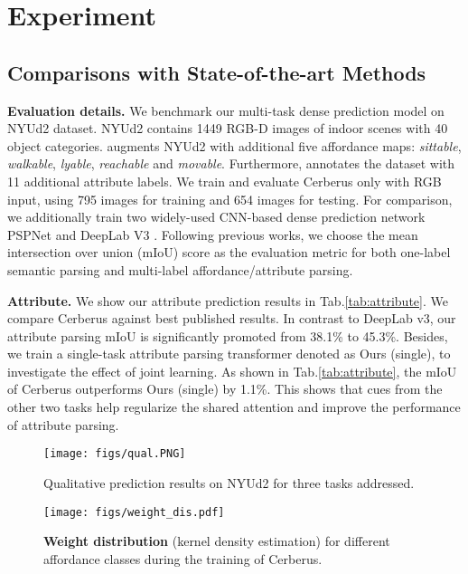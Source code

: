 \documentclass[10pt,twocolumn,letterpaper]{article}
\begin{document}
\section{Experiment}

\subsection{Comparisons with State-of-the-art Methods}
\textbf{Evaluation details.} We benchmark our multi-task dense prediction model on NYUd2\cite{silberman2012indoor} dataset. NYUd2 contains 1449 RGB-D images of indoor scenes with 40 object categories. \cite{roy2016multi} augments NYUd2 with additional five affordance maps: \emph{sittable}, \emph{walkable}, \emph{lyable}, \emph{reachable} and \emph{movable}. Furthermore, \cite{zheng2014dense} annotates the dataset with 11 additional attribute labels. We train and evaluate Cerberus only with RGB input, using 795 images for training and 654 images for testing. For comparison, we additionally train two widely-used CNN-based dense prediction network PSPNet\cite{zhao2017pyramid} and DeepLab V3 \cite{chen2017rethinking}. Following previous works, we choose the mean intersection over union (mIoU) score as the evaluation metric for both one-label semantic parsing and multi-label affordance/attribute parsing.  

\textbf{Attribute.}
We show our attribute prediction results in Tab.\ref{tab:attribute}. We compare Cerberus against best published results. In contrast to DeepLab v3, our attribute parsing mIoU is significantly  promoted  from 38.1\% to  45.3\%. Besides, we train a single-task attribute parsing transformer denoted as Ours (single), to investigate the effect of joint learning. As shown in Tab.\ref{tab:attribute}, the mIoU of Cerberus outperforms Ours (single) by 1.1\%. This shows that cues from the other two tasks help regularize the shared attention and improve the performance of attribute parsing. 

\begin{figure*}[htbp]
  \centering
  \texttt{[image: figs/qual.PNG]}
  \caption{Qualitative prediction results on NYUd2 for three tasks addressed.}
  \label{fig:qualitative} 
\end{figure*}

\begin{figure*}[htbp]
	\centering
	\texttt{[image: figs/weight\_dis.pdf]}
	\caption{\textbf{Weight distribution} (kernel density estimation) for different affordance classes during the training of Cerberus.}
	\label{fig:Weights} 
\end{figure*}
\end{document}
